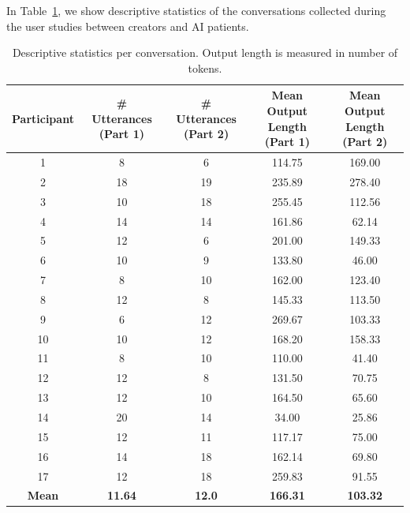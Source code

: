 \documentclass[11pt]{article}
\begin{document}
In Table~\ref{tab:descriptivestats-convos}, we show descriptive statistics of the conversations collected during the user studies between creators and AI patients.
\begin{table}[t]
\small
\centering
\begin{tabular}{|c|c|c|c|c|}
\hline
{\textbf{Participant}} & 
{\textbf{\# Utterances (Part 1)}} & 
{\textbf{\# Utterances (Part 2)}} & 
{\textbf{Mean Output Length (Part 1)}} & 
{\textbf{Mean Output Length (Part 2)}} \\
\hline
1  &  8 &  6 & 114.75  & 169.00  \\ \hline
2  & 18 & 19 & 235.89  & 278.40  \\ \hline
3  & 10 & 18 & 255.45  & 112.56  \\ \hline
4  & 14 & 14 & 161.86  & 62.14   \\ \hline
5  & 12 &  6 & 201.00  & 149.33  \\ \hline
6  & 10 &  9 & 133.80  & 46.00   \\ \hline
7  &  8 & 10 & 162.00  & 123.40  \\ \hline
8  & 12 &  8 & 145.33  & 113.50  \\ \hline
9  &  6 & 12 & 269.67  & 103.33  \\ \hline
10 & 10 & 12 & 168.20  & 158.33  \\ \hline
11 &  8 & 10 & 110.00  &  41.40  \\ \hline
12 & 12 &  8 & 131.50  &  70.75  \\ \hline
13 & 12 & 10 & 164.50  &  65.60  \\ \hline
14 & 20 & 14 &  34.00  &  25.86  \\ \hline
15 & 12 & 11 & 117.17  &  75.00  \\ \hline
16 & 14 & 18 & 162.14  &  69.80  \\ \hline
17 & 12 & 18 & 259.83  &  91.55  \\ \hline
\textbf{Mean} & \textbf{11.64} & \textbf{12.0} & \textbf{166.31} & \textbf{103.32} \\
\hline
\end{tabular}
\caption{Descriptive statistics per conversation. Output length is measured in number of tokens.}
\label{tab:descriptivestats-convos}
\end{table}
\end{document}
